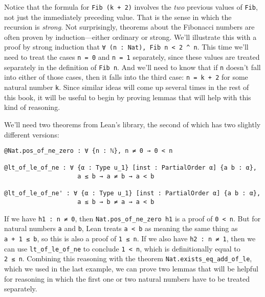 \documentclass[
  letterpaper,
  DIV=11,
  numbers=noendperiod]{scrreprt}
\newenvironment{ind}
	{\begin{list}{}{\setlength{\leftmargin}{1em}}\item\relax}
	{\end{list}}
\theoremstyle{remark}
\begin{document}
Notice that the formula for \texttt{Fib\ (k\ +\ 2)} involves the
\emph{two} previous values of \texttt{Fib}, not just the immediately
preceding value. That is the sense in which the recursion is
\emph{strong}. Not surprisingly, theorems about the Fibonacci numbers
are often proven by induction---either ordinary or strong. We'll
illustrate this with a proof by strong induction that
\texttt{∀\ (n\ :\ Nat),\ Fib\ n\ \textless{}\ 2\ \^{}\ n}. This time
we'll need to treat the cases \texttt{n\ =\ 0} and \texttt{n\ =\ 1}
separately, since these values are treated separately in the definition
of \texttt{Fib\ n}. And we'll need to know that if \texttt{n} doesn't
fall into either of those cases, then it falls into the third case:
\texttt{n\ =\ k\ +\ 2} for some natural number \texttt{k}. Since similar
ideas will come up several times in the rest of this book, it will be
useful to begin by proving lemmas that will help with this kind of
reasoning.

We'll need two theorems from Lean's library, the second of which has two
slightly different versions:

\begin{ind}

\begin{verbatim}
@Nat.pos_of_ne_zero : ∀ {n : ℕ}, n ≠ 0 → 0 < n

@lt_of_le_of_ne : ∀ {α : Type u_1} [inst : PartialOrder α] {a b : α},
                    a ≤ b → a ≠ b → a < b

@lt_of_le_of_ne' : ∀ {α : Type u_1} [inst : PartialOrder α] {a b : α},
                    a ≤ b → b ≠ a → a < b
\end{verbatim}

\end{ind}

If we have \texttt{h1\ :\ n\ ≠\ 0}, then
\texttt{Nat.pos\_of\_ne\_zero\ h1} is a proof of
\texttt{0\ \textless{}\ n}. But for natural numbers \texttt{a} and
\texttt{b}, Lean treats \texttt{a\ \textless{}\ b} as meaning the same
thing as \texttt{a\ +\ 1\ ≤\ b}, so this is also a proof of
\texttt{1\ ≤\ n}. If we also have \texttt{h2\ :\ n\ ≠\ 1}, then we can
use \texttt{lt\_of\_le\_of\_ne\textquotesingle{}} to conclude
\texttt{1\ \textless{}\ n}, which is definitionally equal to
\texttt{2\ ≤\ n}. Combining this reasoning with the theorem
\texttt{Nat.exists\_eq\_add\_of\_le\textquotesingle{}}, which we used in
the last example, we can prove two lemmas that will be helpful for
reasoning in which the first one or two natural numbers have to be
treated separately.
\end{document}
